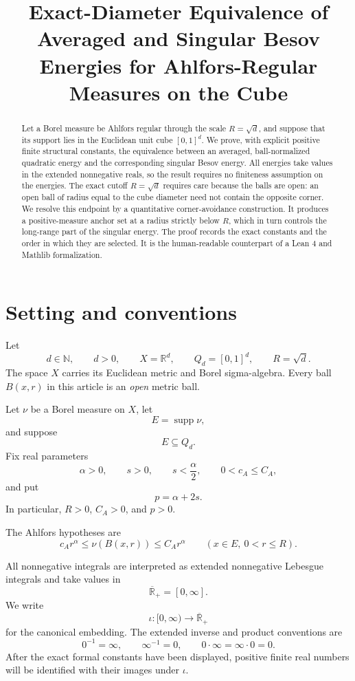 \documentclass[11pt]{article}
\title{Exact-Diameter Equivalence of Averaged and Singular Besov Energies
for Ahlfors-Regular Measures on the Cube}
\author{}
\date{}
\theoremstyle{remark}
\newcommand{\Rbarp}{\overline{\mathbb R}_{+}}
\newcommand{\supp}{\operatorname{supp}}
\newcommand{\Cube}{Q_d}
\begin{document}
\maketitle

\begin{abstract}
Let a Borel measure be Ahlfors regular through the scale
\(R=\sqrt d\), and suppose that its support lies in the Euclidean unit
cube \([0,1]^d\).  We prove, with explicit positive finite structural
constants, the equivalence between an averaged, ball-normalized quadratic
energy and the corresponding singular Besov energy.  All energies take
values in the extended nonnegative reals, so the result requires no
finiteness assumption on the energies.  The exact cutoff \(R=\sqrt d\)
requires care because the balls are open: an open ball of radius equal to
the cube diameter need not contain the opposite corner.  We resolve this
endpoint by a quantitative corner-avoidance construction.  It produces a
positive-measure anchor set at a radius strictly below \(R\), which in turn
controls the long-range part of the singular energy.  The proof records the
exact constants and the order in which they are selected.  It is the
human-readable counterpart of a Lean 4 and Mathlib formalization.
\end{abstract}

\tableofcontents

\section{Setting and conventions}

Let
\[
  d\in\mathbb N,\qquad d>0,\qquad
  X=\mathbb R^d,\qquad
  \Cube=[0,1]^d,\qquad
  R=\sqrt d.
\]
The space \(X\) carries its Euclidean metric and Borel sigma-algebra.
Every ball \(B(x,r)\) in this article is an \emph{open} metric ball.

Let \(\nu\) be a Borel measure on \(X\), let
\[
  E=\supp\nu,
\]
and suppose
\[
  E\subseteq\Cube.
\]
Fix real parameters
\[
  \alpha>0,\qquad s>0,\qquad s<\frac{\alpha}{2},
  \qquad 0<c_A\leq C_A,
\]
and put
\[
  p=\alpha+2s.
\]
In particular, \(R>0\), \(C_A>0\), and \(p>0\).

The Ahlfors hypotheses are
\begin{equation*}
  c_A r^\alpha
  \leq \nu(B(x,r))
  \leq C_A r^\alpha
  \qquad
  (x\in E,\ 0<r\leq R).
  \tag{AR}
\end{equation*}

All nonnegative integrals are interpreted as extended nonnegative Lebesgue
integrals and take values in
\[
  \Rbarp=[0,\infty].
\]
We write
\[
  \iota:[0,\infty)\longrightarrow\Rbarp
\]
for the canonical embedding.  The extended inverse and product conventions
are
\[
  0^{-1}=\infty,\qquad
  \infty^{-1}=0,\qquad
  0\cdot\infty=\infty\cdot0=0.
\]
After the exact formal constants have been displayed, positive finite real
numbers will be identified with their images under \(\iota\).
\end{document}
